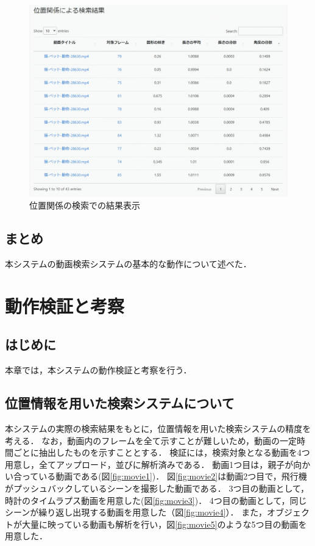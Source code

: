 \documentclass[a4j,12pt,dvipdfmx]{jreport}
\begin{document}
\begin{figure}[t]
  \centering
  \includegraphics[width=13cm]{image/result0_2.png}
  \caption{位置関係の検索での結果表示}
  \label{fig:result0_2}
\end{figure}


\section{まとめ}\label{chap:3-6}
本システムの動画検索システムの基本的な動作について述べた．

\clearpage

\chapter{動作検証と考察}
\label{sec:consideration}

\section{はじめに}\label{chap4-1}
本章では，本システムの動作検証と考察を行う．

\section{位置情報を用いた検索システムについて}\label{chap4-2}
本システムの実際の検索結果をもとに，位置情報を用いた検索システムの精度を考える．
なお，動画内のフレームを全て示すことが難しいため，動画の一定時間ごとに抽出したものを示すこととする．
検証には，検索対象となる動画を4つ用意し，全てアップロード，並びに解析済みである．
動画1つ目は，親子が向かい合っている動画である(図\ref{fig:movie1})．
図\ref{fig:movie2}は動画2つ目で，飛行機がプッシュバックしているシーンを撮影した動画である．
3つ目の動画として，時計のタイムラプス動画を用意した(図\ref{fig:movie3})．
4つ目の動画として，同じシーンが繰り返し出現する動画を用意した（図\ref{fig:movie4}）．
また，オブジェクトが大量に映っている動画も解析を行い，図\ref{fig:movie5}のような5つ目の動画を用意した．
\end{document}
